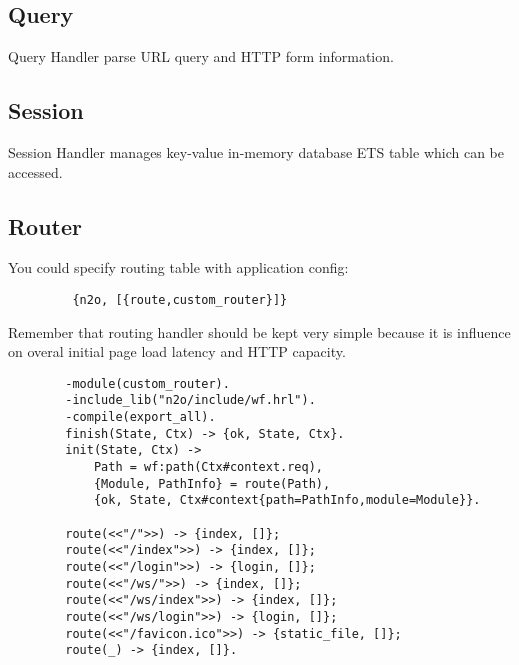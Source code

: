 \subsection{Query}
Query Handler parse URL query and HTTP form information.

\subsection{Session}
Session Handler manages key-value in-memory database ETS table which can be accessed.

\newpage
\subsection{Router}
You could specify routing table with application config:

\vspace{1\baselineskip}
\begin{lstlisting}
         {n2o, [{route,custom_router}]}
\end{lstlisting}
\vspace{1\baselineskip}

Remember that routing handler should be kept very simple because it is
influence on overal initial page load latency and HTTP capacity.

\vspace{1\baselineskip}
\begin{lstlisting}
        -module(custom_router).
        -include_lib("n2o/include/wf.hrl").
        -compile(export_all).
        finish(State, Ctx) -> {ok, State, Ctx}.
        init(State, Ctx) -> 
            Path = wf:path(Ctx#context.req),
            {Module, PathInfo} = route(Path),
            {ok, State, Ctx#context{path=PathInfo,module=Module}}.

        route(<<"/">>) -> {index, []};
        route(<<"/index">>) -> {index, []};
        route(<<"/login">>) -> {login, []};
        route(<<"/ws/">>) -> {index, []};
        route(<<"/ws/index">>) -> {index, []};
        route(<<"/ws/login">>) -> {login, []};
        route(<<"/favicon.ico">>) -> {static_file, []};
        route(_) -> {index, []}.
\end{lstlisting}
